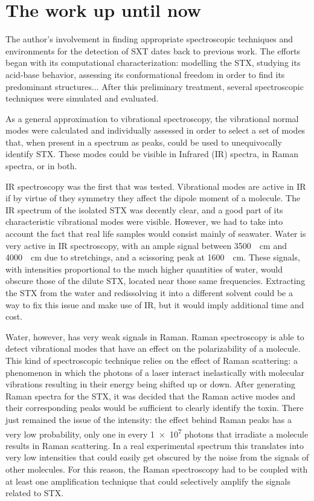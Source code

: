 \section{The work up until now}

The author's involvement in finding appropriate spectroscopic techniques and environments for the detection of SXT dates back to previous work.
The efforts began with its computational characterization: modelling the STX, studying its acid-base behavior, assessing its conformational freedom in order to find its predominant structures...
After this preliminary treatment, several spectroscopic techniques were simulated and evaluated.

As a general approximation to vibrational spectroscopy, the vibrational normal modes were calculated and individually assessed in order to select a set of modes that, when present in a spectrum as peaks, could be used to unequivocally identify STX.
These modes could be visible in Infrared (IR) spectra, in Raman spectra, or in both.

IR spectroscopy was the first that was tested.
Vibrational modes are active in IR if by virtue of they symmetry they affect the dipole moment of a molecule.
The IR spectrum of the isolated STX was decently clear, and a good part of its characteristic vibrational modes were visible.
However, we had to take into account the fact that real life samples would consist mainly of seawater.
Water is very active in IR spectroscopy, with an ample signal between \SI{3500}{\per\cm} and \SI{4000}{\per\cm} due to stretchings, and a scissoring peak at \SI{1600}{\per\cm}.
These signals, with intensities proportional to the much higher quantities of water, would obscure those of the dilute STX, located near those same frequencies.
Extracting the STX from the water and redissolving it into a different solvent could be a way to fix this issue and make use of IR, but it would imply additional time and cost.

Water, however, has very weak signals in Raman.
Raman spectroscopy is able to detect vibrational modes that have an effect on the polarizability of a molecule.
This kind of spectroscopic technique relies on the effect of Raman scattering: a phenomenon in which the photons of a laser interact inelastically with molecular vibrations resulting in their energy being shifted up or down.
After generating Raman spectra for the STX, it was decided that the Raman active modes and their corresponding peaks would be sufficient to clearly identify the toxin.
There just remained the issue of the intensity: the effect behind Raman peaks has a very low probability, only one in every \num{1e7} photons that irradiate a molecule results in Raman scattering.
In a real experimental spectrum this translates into very low intensities that could easily get obscured by the noise from the signals of other molecules.
For this reason, the Raman spectroscopy had to be coupled with at least one amplification technique that could selectively amplify the signals related to STX.


